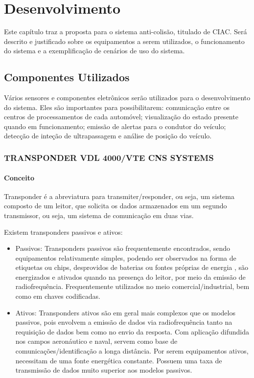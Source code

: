 \chapter[Desenvolvimento]{Desenvolvimento}
Este capítulo traz a proposta para o sistema anti-colisão, titulado de CIAC.
Será descrito e justificado sobre os equipamentos a serem utilizados, o funcionamento
do sistema e a exemplificação de cenários de uso do sistema.

\section{Componentes Utilizados}

Vários sensores e componentes eletrônicos serão utilizados para o desenvolvimento
do sistema. Eles são importantes para possibilitarem: comunicação entre
os centros de processamentos de cada automóvel; visualização do estado presente
quando em funcionamento; emissão de alertas para o condutor do veículo; detecção
de inteção de ultrapassagem e análise de posição do veículo.

\subsection{TRANSPONDER VDL 4000/VTE CNS SYSTEMS}

\subsubsection{Conceito}
Transponder é a abreviatura para transmiter/responder, ou seja, um sistema
composto de um leitor, que solicita os dados armazenados em um segundo
transmissor, ou seja, um sistema de comunicação em duas vias.

Existem transponders passivos e ativos:

\begin{itemize}
  \item Passivos: Transponders passivos são frequentemente encontrados,
  sendo equipamentos relativamente simples, podendo ser observados na forma
  de etiquetas ou chips, desprovidos de baterias ou fontes próprias de energia
  , são energizados e ativados quando na presença do leitor, por meio da
   emissão de radiofrequência. Frequentemente utilizados no meio
   comercial/industrial, bem como em chaves codificadas.
  \item Ativos: Transponders ativos são em geral mais complexos que os
  modelos passivos, pois envolvem a emissão de dados via radiofrequência
  tanto na requisição de dados bem como no envio da resposta. Com aplicação
  difundida nos campos aeronáutico e naval, servem como base de
  comunicações/identificação a longa distância. Por serem equipamentos ativos,
  necessitam de uma fonte energética constante. Possuem uma taxa de
  transmissão de dados muito superior aos modelos passivos.
\end{itemize}

